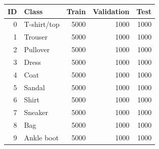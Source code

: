 \begin{tabular}{rlrrr}
\toprule
ID & Class & Train & Validation & Test \\
\midrule
0 & T-shirt/top & 5000 & 1000 & 1000 \\
1 & Trouser & 5000 & 1000 & 1000 \\
2 & Pullover & 5000 & 1000 & 1000 \\
3 & Dress & 5000 & 1000 & 1000 \\
4 & Coat & 5000 & 1000 & 1000 \\
5 & Sandal & 5000 & 1000 & 1000 \\
6 & Shirt & 5000 & 1000 & 1000 \\
7 & Sneaker & 5000 & 1000 & 1000 \\
8 & Bag & 5000 & 1000 & 1000 \\
9 & Ankle boot & 5000 & 1000 & 1000 \\
\bottomrule
\end{tabular}
